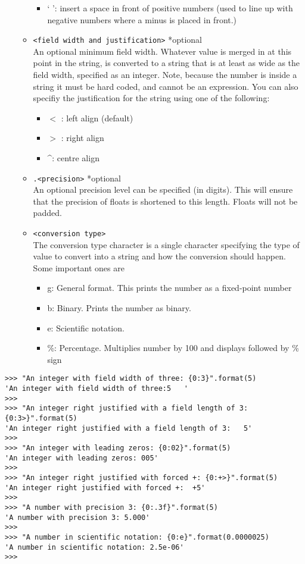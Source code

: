 \begin{enumerate}
\begin{itemize}
\begin{itemize}
	\item ` ': insert a space in front of positive numbers      (used to line up with negative numbers where a minus is      placed in front.)
\end{itemize}
	\item 
\texttt{<field width and justification>} *optional
\\     An optional minimum field width. Whatever value is merged in at    this point in the string, is converted to a string that is at least    as wide as the field width, specified as an integer. Note, because    the number is inside a string it must be hard coded, and cannot be    an expression. You can also specifiy the justification for the string using       one of the following:
\begin{itemize}
	\item $<$ : left align (default)
	\item $>$ : right align 
	\item \textasciicircum : centre align
\end{itemize}
	\item 
\texttt{.<precision>} *optional
\\        An optional precision level can be specified (in digits). This will    ensure that the precision of floats is shortened to this length.    Floats will not be padded.
	\item 
\texttt{<conversion type>}
\\         The conversion type character is a single character specifying     the type of value to convert into a string and how the     conversion should happen. Some important ones     are      
\begin{itemize}
	\item g: General format. This prints the number as a fixed-point number
	\item b: Binary. Prints the number as binary.
	\item e: Scientific notation.
	\item \%: Percentage. Multiplies number by 100 and displays followed by \% sign
\end{itemize}
\end{itemize}
\end{enumerate}
\begin{lstlisting}
>>> "An integer with field width of three: {0:3}".format(5)
'An integer with field width of three:5   '
>>>
>>> "An integer right justified with a field length of 3: {0:3>}".format(5) 
'An integer right justified with a field length of 3:   5'
>>>
>>> "An integer with leading zeros: {0:02}".format(5)
'An integer with leading zeros: 005'
>>>
>>> "An integer right justified with forced +: {0:+>}".format(5)
'An integer right justified with forced +:  +5'
>>>
>>> "A number with precision 3: {0:.3f}".format(5)
'A number with precision 3: 5.000'
>>>
>>> "A number in scientific notation: {0:e}".format(0.0000025)
'A number in scientific notation: 2.5e-06'
>>>
\end{lstlisting}

